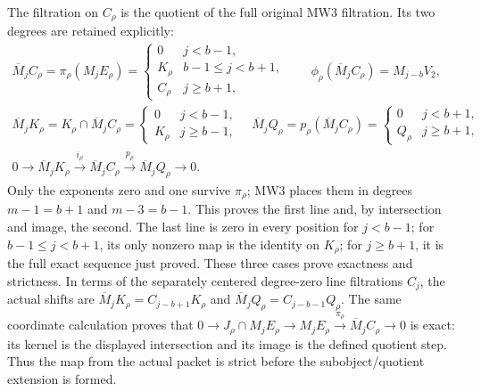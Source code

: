 The filtration on \(C_\rho\) is the quotient of the full original
MW3 filtration. Its two degrees are retained explicitly:
\[
 \begin{gathered}
 \overline M_jC_\rho=\pi_\rho(M_jE_\rho)
   =\begin{cases}
      0&j<b-1,\\K_\rho&b-1\leq j<b+1,\\C_\rho&j\geq b+1,
     \end{cases}
 \qquad \phi_\rho(\overline M_jC_\rho)=M_{j-b}V_2,\\
 \overline M_jK_\rho=K_\rho\cap\overline M_jC_\rho
       =\begin{cases}0&j<b-1,\\K_\rho&j\geq b-1,\end{cases}
 \quad
 \overline M_jQ_\rho=p_\rho(\overline M_jC_\rho)
       =\begin{cases}0&j<b+1,\\Q_\rho&j\geq b+1,\end{cases}\\
 0\longrightarrow\overline M_jK_\rho
   \xrightarrow{i_\rho}\overline M_jC_\rho
   \xrightarrow{p_\rho}\overline M_jQ_\rho\longrightarrow0.
 \end{gathered}
 \tag{MRE35}
\]
Only the exponents zero and one survive \(\pi_\rho\); MW3 places
them in degrees \(m-1=b+1\) and \(m-3=b-1\). This proves the
first line and, by intersection and image, the second. The last
line is zero in every position for \(j<b-1\); for
\(b-1\leq j<b+1\), its only nonzero map is the identity on
\(K_\rho\); for \(j\geq b+1\), it is the full exact sequence
just proved. These three cases prove exactness and strictness.
In terms of the separately centered degree-zero line filtrations
\(C_j\), the actual shifts are
\(\overline M_jK_\rho=C_{j-b+1}K_\rho\) and
\(\overline M_jQ_\rho=C_{j-b-1}Q_\rho\).
The same coordinate calculation proves that
\(0\to J_\rho\cap M_jE_\rho\to M_jE_\rho
\xrightarrow{\pi_\rho}\overline M_jC_\rho\to0\) is exact:
its kernel is the displayed intersection and its image is the
defined quotient step. Thus the map from the actual packet is
strict before the subobject/quotient extension is formed.

